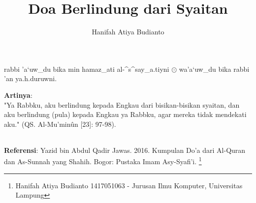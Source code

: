 \documentclass[a4paper,12pt]{article}
\title{\Large Doa Berlindung dari Syaitan}
\author{\calligra Hanifah Atiya Budianto}
\begin{document}
\sffamily
\maketitle 
\fullvocalize
{}
\begin{arabtext}
\noindent
rabbi 'a`uw_du bika min hamaz_ati al-^s^say_a.tiyni $\odot$ wa'a`uw_du 
bika rabbi 'an ya.h.duruwni.\\
\end{arabtext}
\noindent
\textbf{Artinya}:\\
\indent
"Ya Rabbku, aku berlindung kepada Engkau dari bisikan-bisikan syaitan, dan 
aku berlindung (pula) kepada Engkau ya Rabbku, agar mereka tidak mendekati 
aku." (QS. Al-Mu'min\^{u}n [23]: 97-98).\\\\
\par
\noindent
\textbf{Referensi}: Yazid bin Abdul Qadir Jawas. 2016. Kumpulan Do'a dari
Al-Quran dan As-Sunnah yang Shahih. Bogor: Pustaka Imam Asy-Syafi'i.
\footnote{Hanifah Atiya Budianto 1417051063 - Jurusan Ilmu Komputer,
Universitas Lampung}
\end{document}
